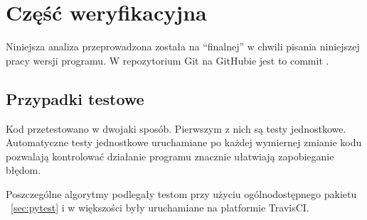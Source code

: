 \section[Weryfikacja]{Część weryfikacyjna}\label{sec:verification} %
    Niniejsza analiza przeprowadzona została na ``finalnej'' w chwili pisania
    niniejszej pracy wersji programu.  W repozytorium Git na GitHubie jest to
    commit .

    \subsection{Przypadki testowe}

    Kod przetestowano w dwojaki sposób. Pierwszym z nich są testy jednostkowe.
    Automatyczne testy jednostkowe uruchamiane po każdej wymiernej zmianie kodu
    pozwalają kontrolować działanie programu znacznie ułatwiają zapobieganie
    błędom.

    Poszczególne algorytmy podlegały testom przy użyciu ogólnodostępnego
    pakietu ~\ref{sec:pytest} i w większości były
    uruchamiane na platformie TravisCI\@.

